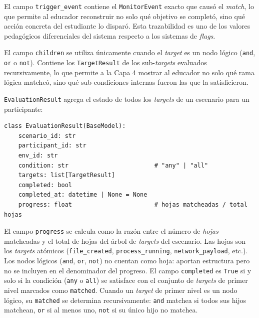 El campo \texttt{trigger\_event} contiene el \texttt{MonitorEvent} exacto que
causó el \textit{match}, lo que permite al educador reconstruir no solo qué
objetivo se completó, sino qué acción concreta del estudiante lo disparó. Esta
trazabilidad es uno de los valores pedagógicos diferenciales del sistema
respecto a los sistemas de \textit{flags}.

El campo \texttt{children} se utiliza únicamente cuando el \textit{target} es un
nodo lógico (\texttt{and}, \texttt{or} o \texttt{not}). Contiene los
\texttt{TargetResult} de los sub-\textit{targets} evaluados recursivamente, lo
que permite a la Capa 4 mostrar al educador no solo qué rama lógica matcheó,
sino qué sub-condiciones internas fueron las que la satisficieron.

\texttt{EvaluationResult} agrega el estado de todos los \textit{targets} de un
escenario para un participante:

\begin{verbatim}
class EvaluationResult(BaseModel):
    scenario_id: str
    participant_id: str
    env_id: str
    condition: str                        # "any" | "all"
    targets: list[TargetResult]
    completed: bool
    completed_at: datetime | None = None
    progress: float                       # hojas matcheadas / total hojas
\end{verbatim}

El campo \texttt{progress} se calcula como la razón entre el número de
\emph{hojas} matcheadas y el total de hojas del árbol de \textit{targets} del
escenario. Las hojas son los \textit{targets} atómicos (\texttt{file\_created},
\texttt{process\_running}, \texttt{network\_payload}, etc.). Los nodos lógicos
(\texttt{and}, \texttt{or}, \texttt{not}) no cuentan como hoja: aportan
estructura pero no se incluyen en el denominador del progreso. El campo
\texttt{completed} es \texttt{True} si y solo si la condición (\texttt{any} o
\texttt{all}) se satisface con el conjunto de \textit{targets} de primer nivel
marcados como \texttt{matched}. Cuando un \textit{target} de primer nivel es un
nodo lógico, su
\texttt{matched} se determina recursivamente: \texttt{and} matchea si todos sus
hijos matchean, \texttt{or} si al menos uno, \texttt{not} si su único hijo no
matchea.

